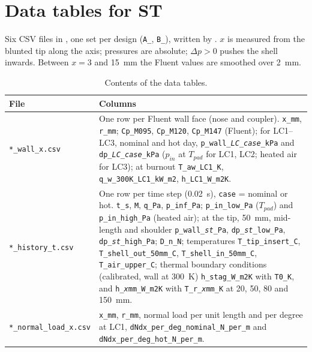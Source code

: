 \section{Data tables for ST}
\label{app:data}

Six CSV files in , one set per design (\texttt{A\_}, \texttt{B\_}), written by
. $x$ is measured from the blunted tip along the axis; pressures are absolute;
$\Delta p > 0$ pushes the shell inwards. Between $x = 3$ and \SI{15}{mm} the Fluent values are smoothed
over \SI{2}{mm}.

\begin{table}[H]
\centering
\caption{Contents of the data tables.}
\label{tab:data}
\small
\begin{tabularx}{\linewidth}{@{}l>{\raggedright\arraybackslash}X@{}}
\toprule
File & Columns\\
\midrule
\texttt{*\_wall\_x.csv} & One row per Fluent wall face (nose and coupler). \texttt{x\_mm}, \texttt{r\_mm};
\texttt{Cp\_M095}, \texttt{Cp\_M120}, \texttt{Cp\_M147} (Fluent); for LC1--LC3, nominal and hot day,
\texttt{p\_wall\_\textit{LC}\_\textit{case}\_kPa} and \texttt{dp\_\textit{LC}\_\textit{case}\_kPa}
($p_{in}$ at $T_{pad}$ for LC1, LC2; heated air for LC3); at burnout \texttt{T\_aw\_LC1\_K},
\texttt{q\_w\_300K\_LC1\_kW\_m2}, \texttt{h\_LC1\_W\_m2K}.\\
\addlinespace
\texttt{*\_history\_t.csv} & One row per time step (\SI{0.02}{s}), \texttt{case} = nominal or hot.
\texttt{t\_s}, \texttt{M}, \texttt{q\_Pa}, \texttt{p\_inf\_Pa}; \texttt{p\_in\_low\_Pa} ($T_{pad}$) and
\texttt{p\_in\_high\_Pa} (heated air); at the tip, \SI{50}{mm}, mid-length and shoulder
\texttt{p\_wall\_\textit{st}\_Pa}, \texttt{dp\_\textit{st}\_low\_Pa}, \texttt{dp\_\textit{st}\_high\_Pa};
\texttt{D\_n\_N}; temperatures \texttt{T\_tip\_insert\_C}, \texttt{T\_shell\_out\_50mm\_C},
\texttt{T\_shell\_in\_50mm\_C}, \texttt{T\_air\_upper\_C}; thermal boundary conditions (calibrated, wall
at \SI{300}{K}) \texttt{h\_stag\_W\_m2K} with \texttt{T0\_K}, and \texttt{h\_\textit{x}mm\_W\_m2K} with
\texttt{T\_r\_\textit{x}mm\_K} at 20, 50, 80 and \SI{150}{mm}.\\
\addlinespace
\texttt{*\_normal\_load\_x.csv} & \texttt{x\_mm}, \texttt{r\_mm}, normal load per unit length and per
degree at LC1, \texttt{dNdx\_per\_deg\_nominal\_N\_per\_m} and \texttt{dNdx\_per\_deg\_hot\_N\_per\_m}.\\
\bottomrule
\end{tabularx}
\end{table}
